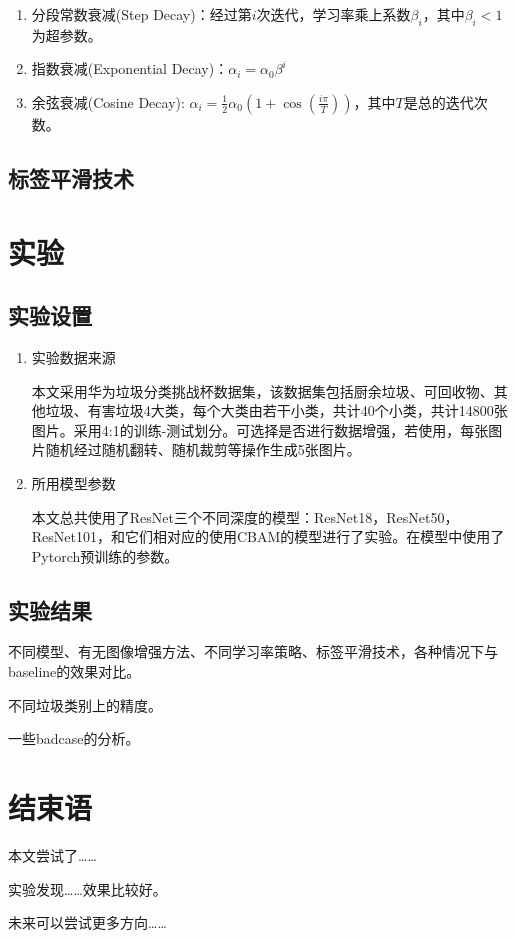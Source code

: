 \documentclass[a4paper]{article}
\begin{document}
\begin{CJK*}{UTF8}{gbsn}
\begin{enumerate}
    \item 分段常数衰减(Step Decay)：经过第$i$次迭代，学习率乘上系数$\beta_i$，其中$\beta_i<1$为超参数。
    \item 指数衰减(Exponential Decay)：$\alpha_i=\alpha_0\beta^i$
    \item 余弦衰减(Cosine Decay): $\alpha_i=\frac{1}{2}\alpha_0(1+\cos(\frac{i\pi}{T}))$，其中$T$是总的迭代次数。
\end{enumerate}


\subsection{标签平滑技术}

\section{实验}
\subsection{实验设置}
\begin{enumerate}
\item 实验数据来源

本文采用华为垃圾分类挑战杯数据集，该数据集包括厨余垃圾、可回收物、其他垃圾、有害垃圾4大类，每个大类由若干小类，共计40个小类，共计14800张图片。采用4:1的训练-测试划分。可选择是否进行数据增强，若使用，每张图片随机经过随机翻转、随机裁剪等操作生成5张图片。

\item 所用模型参数

本文总共使用了ResNet三个不同深度的模型：ResNet18，ResNet50，ResNet101，和它们相对应的使用CBAM的模型进行了实验。在模型中使用了Pytorch预训练的参数。

\end{enumerate}

\subsection{实验结果}
不同模型、有无图像增强方法、不同学习率策略、标签平滑技术，各种情况下与baseline的效果对比。

不同垃圾类别上的精度。

一些badcase的分析。
\section{结束语}
本文尝试了……

实验发现……效果比较好。

未来可以尝试更多方向……




\end{CJK*}
\end{document}
